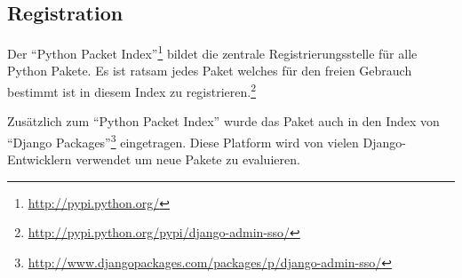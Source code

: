 \subsection{Registration}
\label{sub:registration}
Der ``Python Packet Index''\footnote{\url{http://pypi.python.org/}} bildet die zentrale Registrierungsstelle für alle Python Pakete. Es ist ratsam jedes Paket welches für den freien Gebrauch bestimmt ist in diesem Index zu registrieren.\footnote{\url{http://pypi.python.org/pypi/django-admin-sso/}}

Zusätzlich zum ``Python Packet Index'' wurde das Paket auch in den Index von ``Django Packages''\footnote{\url{http://www.djangopackages.com/packages/p/django-admin-sso/}} eingetragen. Diese Platform wird von vielen Django-Entwicklern verwendet um neue Pakete zu evaluieren.
